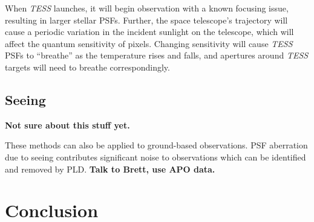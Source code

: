 \documentclass[12pt,preprint]{aastex}
\begin{document}
When \textit{TESS} launches, it will begin observation with a known focusing issue, resulting in larger stellar PSFs. Further, the space telescope's trajectory will cause a periodic variation in the incident sunlight on the telescope, which will affect the quantum sensitivity of pixels. Changing sensitivity will cause \textit{TESS} PSFs to ``breathe'' as the temperature rises and falls, and apertures around \textit{TESS} targets will need to breathe correspondingly.

\subsection{Seeing}

\textbf{Not sure about this stuff yet.}

These methods can also be applied to ground-based observations. PSF aberration due to seeing contributes significant noise to observations which can be identified and removed by PLD. \textbf{Talk to Brett, use APO data.}

\section{Conclusion}

\clearpage


\end{document}
